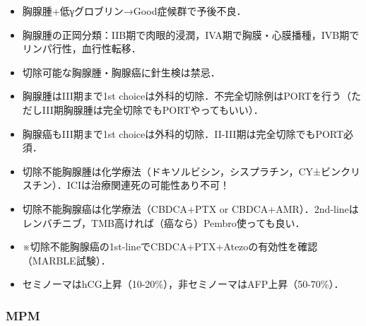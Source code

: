 \begin{itemize}
\item 胸腺腫+低γグロブリン→Good症候群で予後不良．
\item 胸腺腫の正岡分類：IIB期で肉眼的浸潤，IVA期で胸膜・心膜播種，IVB期でリンパ行性，血行性転移．


\item 切除可能な胸腺腫・胸腺癌に針生検は禁忌．
\item 胸腺腫はIII期まで1st choiceは外科的切除．不完全切除例はPORTを行う（ただしIII期胸腺腫は完全切除でもPORTやってもいい）．
\item 胸腺癌もIII期まで1st choiceは外科的切除．II-III期は完全切除でもPORT必須．
\item 切除不能胸腺腫は化学療法（ドキソルビシン，シスプラチン，CY±ビンクリスチン）．ICIは治療関連死の可能性あり不可！
\item 切除不能胸腺癌は化学療法（CBDCA+PTX or CBDCA+AMR）．2nd-lineはレンバチニブ，TMB高ければ（癌なら）Pembro使っても良い．
\item ※切除不能胸腺癌の1st-lineでCBDCA+PTX+Atezoの有効性を確認（MARBLE試験）．
\item セミノーマはhCG上昇（10-20\%），非セミノーマはAFP上昇（50-70\%）．
\end{itemize}


\subsubsection{MPM}


